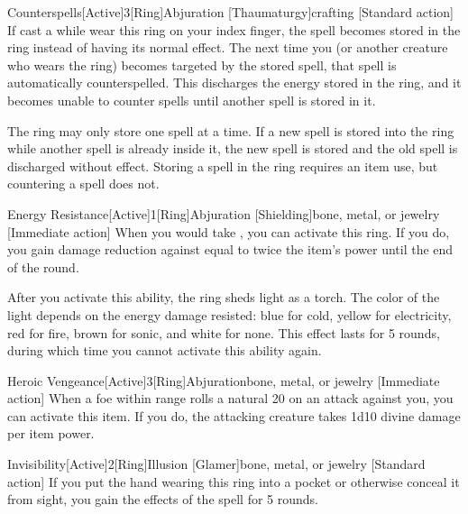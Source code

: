         \begin{magicitemdef}{Counterspells}[Active]{3}[Ring]{Abjuration [Thaumaturgy]}{crafting}
            [Standard action] If cast a  while wear this ring on your index finger, the spell becomes stored in the ring instead of having its normal effect.
            The next time you (or another creature who wears the ring) becomes targeted by the stored spell, that spell is automatically counterspelled.
            This discharges the energy stored in the ring, and it becomes unable to counter spells until another spell is stored in it.

            The ring may only store one spell at a time.
            If a new spell is stored into the ring while another spell is already inside it, the new spell is stored and the old spell is discharged without effect.
            Storing a spell in the ring requires an item use, but countering a spell does not.
        \end{magicitemdef}

        \begin{magicitemdef}{Energy Resistance}[Active]{1}[Ring]{Abjuration [Shielding]}{bone, metal, or jewelry}
            [Immediate action] When you would take , you can activate this ring.
            If you do, you gain damage reduction against  equal to twice the item's power until the end of the round.

            After you activate this ability, the ring sheds light as a torch.
            The color of the light depends on the energy damage resisted: blue for cold, yellow for electricity, red for fire, brown for sonic, and white for none.
            This effect lasts for 5 rounds, during which time you cannot activate this ability again.
        \end{magicitemdef}

        \begin{magicitemdef}{Heroic Vengeance}[Active]{3}[Ring]{Abjuration}{bone, metal, or jewelry}
            [Immediate action] When a foe within \rngmed range rolls a natural 20 on an attack against you, you can activate this item.
            If you do, the attacking creature takes 1d10 divine damage per item power.
        \end{magicitemdef}

        \begin{magicitemdef}{Invisibility}[Active]{2}[Ring]{Illusion [Glamer]}{bone, metal, or jewelry}
            [Standard action] If you put the hand wearing this ring into a pocket or otherwise conceal it from sight, you gain the effects of the  spell for 5 rounds.
        \end{magicitemdef}

